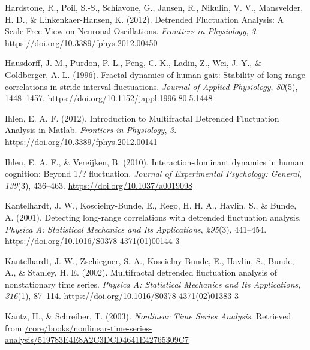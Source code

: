 \documentclass[
  man]{apa6}
\newlength{\cslhangindent}
\newlength{\cslentryspacingunit} %
\newenvironment{CSLReferences}[2] %
 {%
  \setlength{\parindent}{0pt}
  \ifodd #1
  \let\oldpar\par
  \def\par{\hangindent=\cslhangindent\oldpar}
  \fi
  \setlength{\parskip}{#2\cslentryspacingunit}
 }%
 {}
\begin{document}
\begin{CSLReferences}{1}{0}
\leavevmode{}%
Hardstone, R., Poil, S.-S., Schiavone, G., Jansen, R., Nikulin, V. V., Mansvelder, H. D., \& Linkenkaer-Hansen, K. (2012). Detrended {Fluctuation} {Analysis}: {A} {Scale}-{Free} {View} on {Neuronal} {Oscillations}. \emph{Frontiers in Physiology}, \emph{3}. \url{https://doi.org/10.3389/fphys.2012.00450}

\leavevmode{}%
Hausdorff, J. M., Purdon, P. L., Peng, C. K., Ladin, Z., Wei, J. Y., \& Goldberger, A. L. (1996). Fractal dynamics of human gait: Stability of long-range correlations in stride interval fluctuations. \emph{Journal of Applied Physiology}, \emph{80}(5), 1448--1457. \url{https://doi.org/10.1152/jappl.1996.80.5.1448}

\leavevmode{}%
Ihlen, E. A. F. (2012). Introduction to {Multifractal} {Detrended} {Fluctuation} {Analysis} in {Matlab}. \emph{Frontiers in Physiology}, \emph{3}. \url{https://doi.org/10.3389/fphys.2012.00141}

\leavevmode{}%
Ihlen, E. A. F., \& Vereijken, B. (2010). Interaction-dominant dynamics in human cognition: Beyond 1/{\textflorin}? fluctuation. \emph{Journal of Experimental Psychology: General}, \emph{139}(3), 436--463. \url{https://doi.org/10.1037/a0019098}

\leavevmode{}%
Kantelhardt, J. W., Koscielny-Bunde, E., Rego, H. H. A., Havlin, S., \& Bunde, A. (2001). Detecting long-range correlations with detrended fluctuation analysis. \emph{Physica A: Statistical Mechanics and Its Applications}, \emph{295}(3), 441--454. \url{https://doi.org/10.1016/S0378-4371(01)00144-3}

\leavevmode{}%
Kantelhardt, J. W., Zschiegner, S. A., Koscielny-Bunde, E., Havlin, S., Bunde, A., \& Stanley, H. E. (2002). Multifractal detrended fluctuation analysis of nonstationary time series. \emph{Physica A: Statistical Mechanics and Its Applications}, \emph{316}(1), 87--114. \url{https://doi.org/10.1016/S0378-4371(02)01383-3}

\leavevmode{}%
Kantz, H., \& Schreiber, T. (2003). \emph{Nonlinear Time Series Analysis}. Retrieved from \href{https:///core/books/nonlinear-time-series-analysis/519783E4E8A2C3DCD4641E42765309C7}{/core/books/nonlinear-time-series-analysis/519783E4E8A2C3DCD4641E42765309C7}


\end{CSLReferences}
\end{document}
